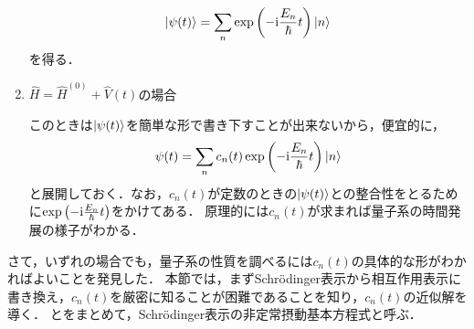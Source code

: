\documentclass{report}
\begin{document}
\begin{enumerate}
\begin{align}
        \ket{\psi(t)} = \sum_{n}\exp\qty(-\mathrm{i}\frac{E_n}{\hbar}t)\ket{n}
      \end{align}
      を得る．
    \item $\hat{H} = \hat{H}^{(0)} + \hat{V}(t)$の場合\par
      このときは$\ket{\psi(t)}$を簡単な形で書き下すことが出来ないから，便宜的に，
      \begin{align}
        \psi(t) = \sum_{n}c_n(t)\exp\qty(-\mathrm{i}\frac{E_n}{\hbar}t)\ket{n}\label{nonsteady-perturbation-cnt-eq}
      \end{align}
      と展開しておく．なお，$c_n(t)$が定数のときの$\ket{\psi(t)}$との整合性をとるために$\exp\qty(-\mathrm{i}\frac{E_n}{\hbar}t)$をかけてある．
      原理的には$c_n(t)$が求まれば量子系の時間発展の様子がわかる．%
  \end{enumerate}
  \par
  さて，いずれの場合でも，量子系の性質を調べるには$c_n(t)$の具体的な形がわかればよいことを発見した．
  本節では，まずSchr\"odinger表示から相互作用表示に書き換え，$c_n(t)$を厳密に知ることが困難であることを知り，$c_n(t)$の近似解を導く．
  とをまとめて，Schr\"odinger表示の非定常摂動基本方程式と呼ぶ．
\end{document}
